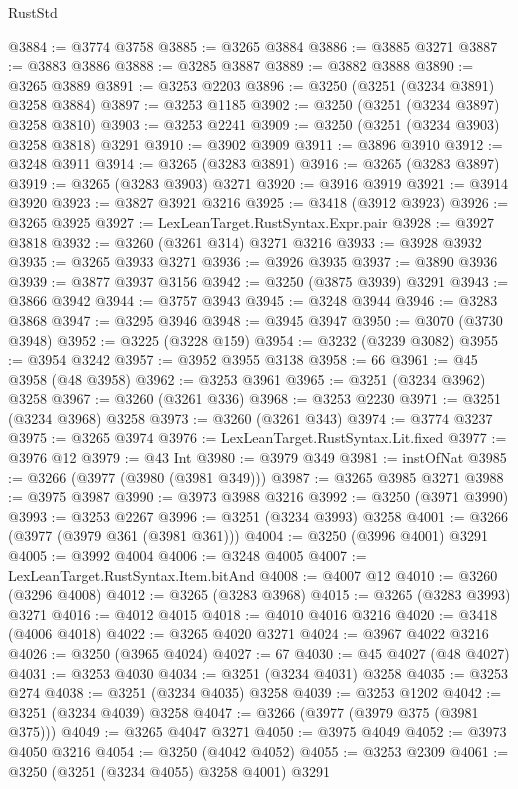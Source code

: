 \begin{lexlean}{RustStd}
\begin{coremodule}
@3884 := @3774 @3758
@3885 := @3265 @3884
@3886 := @3885 @3271
@3887 := @3883 @3886
@3888 := @3285 @3887
@3889 := @3882 @3888
@3890 := @3265 @3889
@3891 := @3253 @2203
@3896 := @3250 (@3251 (@3234 @3891) @3258 @3884)
@3897 := @3253 @1185
@3902 := @3250 (@3251 (@3234 @3897) @3258 @3810)
@3903 := @3253 @2241
@3909 := @3250 (@3251 (@3234 @3903) @3258 @3818) @3291
@3910 := @3902 @3909
@3911 := @3896 @3910
@3912 := @3248 @3911
@3914 := @3265 (@3283 @3891)
@3916 := @3265 (@3283 @3897)
@3919 := @3265 (@3283 @3903) @3271
@3920 := @3916 @3919
@3921 := @3914 @3920
@3923 := @3827 @3921 @3216
@3925 := @3418 (@3912 @3923)
@3926 := @3265 @3925
@3927 := LexLeanTarget.RustSyntax.Expr.pair
@3928 := @3927 @3818
@3932 := @3260 (@3261 @314) @3271 @3216
@3933 := @3928 @3932
@3935 := @3265 @3933 @3271
@3936 := @3926 @3935
@3937 := @3890 @3936
@3939 := @3877 @3937 @3156
@3942 := @3250 (@3875 @3939) @3291
@3943 := @3866 @3942
@3944 := @3757 @3943
@3945 := @3248 @3944
@3946 := @3283 @3868
@3947 := @3295 @3946
@3948 := @3945 @3947
@3950 := @3070 (@3730 @3948)
@3952 := @3225 (@3228 @159)
@3954 := @3232 (@3239 @3082)
@3955 := @3954 @3242
@3957 := @3952 @3955 @3138
@3958 := 66
@3961 := @45 @3958 (@48 @3958)
@3962 := @3253 @3961
@3965 := @3251 (@3234 @3962) @3258
@3967 := @3260 (@3261 @336)
@3968 := @3253 @2230
@3971 := @3251 (@3234 @3968) @3258
@3973 := @3260 (@3261 @343)
@3974 := @3774 @3237
@3975 := @3265 @3974
@3976 := LexLeanTarget.RustSyntax.Lit.fixed
@3977 := @3976 @12
@3979 := @43 Int
@3980 := @3979 @349
@3981 := instOfNat
@3985 := @3266 (@3977 (@3980 (@3981 @349)))
@3987 := @3265 @3985 @3271
@3988 := @3975 @3987
@3990 := @3973 @3988 @3216
@3992 := @3250 (@3971 @3990)
@3993 := @3253 @2267
@3996 := @3251 (@3234 @3993) @3258
@4001 := @3266 (@3977 (@3979 @361 (@3981 @361)))
@4004 := @3250 (@3996 @4001) @3291
@4005 := @3992 @4004
@4006 := @3248 @4005
@4007 := LexLeanTarget.RustSyntax.Item.bitAnd
@4008 := @4007 @12
@4010 := @3260 (@3296 @4008)
@4012 := @3265 (@3283 @3968)
@4015 := @3265 (@3283 @3993) @3271
@4016 := @4012 @4015
@4018 := @4010 @4016 @3216
@4020 := @3418 (@4006 @4018)
@4022 := @3265 @4020 @3271
@4024 := @3967 @4022 @3216
@4026 := @3250 (@3965 @4024)
@4027 := 67
@4030 := @45 @4027 (@48 @4027)
@4031 := @3253 @4030
@4034 := @3251 (@3234 @4031) @3258
@4035 := @3253 @274
@4038 := @3251 (@3234 @4035) @3258
@4039 := @3253 @1202
@4042 := @3251 (@3234 @4039) @3258
@4047 := @3266 (@3977 (@3979 @375 (@3981 @375)))
@4049 := @3265 @4047 @3271
@4050 := @3975 @4049
@4052 := @3973 @4050 @3216
@4054 := @3250 (@4042 @4052)
@4055 := @3253 @2309
@4061 := @3250 (@3251 (@3234 @4055) @3258 @4001) @3291

\end{coremodule}
\end{lexlean}
